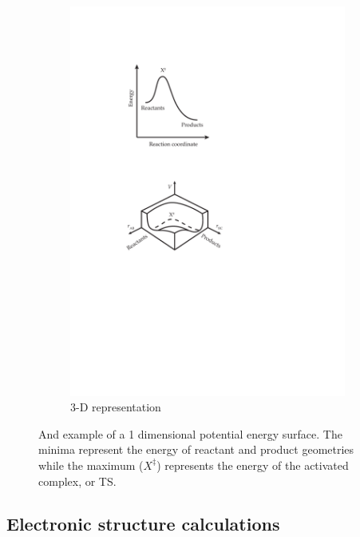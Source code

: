 \documentclass[preprint, 11pt]{elsarticle} %
\begin{document}
\begin{figure}[htbp]
\begin{subfigure}[t]{.5\textwidth}
  \includegraphics{TST-3D-PES}
  \caption{3-D representation}
  \label{fig:sub2}
\end{subfigure}
\caption{And example of a 1 dimensional potential energy surface. The minima represent the energy of reactant and product geometries while the maximum ($X^\ddagger$) represents the energy of the activated complex, or TS.}
\label{fig:pes}
\end{figure}


\subsection{Electronic structure calculations}
\end{document}
